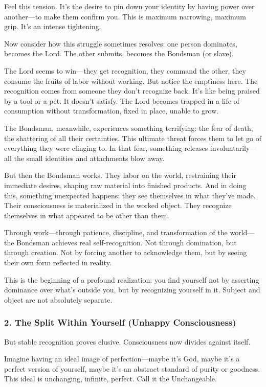 Feel this tension. It's the desire to pin down your identity by having power over another---to make them confirm you. This is maximum narrowing, maximum grip. It's an intense tightening.

Now consider how this struggle sometimes resolves: one person dominates, becomes the Lord. The other submits, becomes the Bondsman (or slave).

The Lord seems to win---they get recognition, they command the other, they consume the fruits of labor without working. But notice the emptiness here. The recognition comes from someone they don't recognize back. It's like being praised by a tool or a pet. It doesn't satisfy. The Lord becomes trapped in a life of consumption without transformation, fixed in place, unable to grow.

The Bondsman, meanwhile, experiences something terrifying: the fear of death, the shattering of all their certainties. This ultimate threat forces them to let go of everything they were clinging to. In that fear, something releases involuntarily---all the small identities and attachments blow away.

But then the Bondsman works. They labor on the world, restraining their immediate desires, shaping raw material into finished products. And in doing this, something unexpected happens: they see themselves in what they've made. Their consciousness is materialized in the worked object. They recognize themselves in what appeared to be other than them.

Through work---through patience, discipline, and transformation of the world---the Bondsman achieves real self-recognition. Not through domination, but through creation. Not by forcing another to acknowledge them, but by seeing their own form reflected in reality.

This is the beginning of a profound realization: you find yourself not by asserting dominance over what's outside you, but by recognizing yourself in it. Subject and object are not absolutely separate.

\subsubsection{2. The Split Within Yourself (Unhappy Consciousness)}\label{the-split-within-yourself-unhappy-consciousness}

But stable recognition proves elusive. Consciousness now divides against itself.

Imagine having an ideal image of perfection---maybe it's God, maybe it's a perfect version of yourself, maybe it's an abstract standard of purity or goodness. This ideal is unchanging, infinite, perfect. Call it the Unchangeable.

